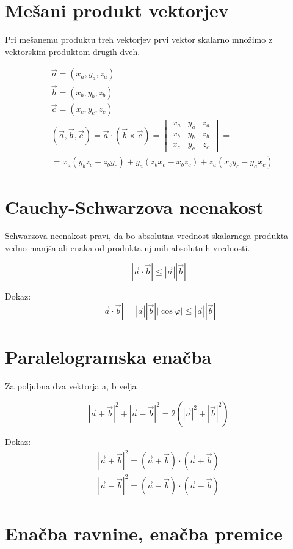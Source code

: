 \documentclass[12pt]{report}
\begin{document}
\section*{Mešani produkt vektorjev}
Pri mešanemu produktu treh vektorjev prvi vektor skalarno množimo z vektorskim produktom drugih dveh.


\begin{align*}
&\vec a = (x_a, y_a, z_a) \\
& \vec b = (x_b, y_b, z_b) \\
& \vec c=(x_c,y_c,z_c)\\
& (\vec a, \vec b,  \vec c) = \vec a \cdot (\vec b \times \vec c) = 
\begin{vmatrix}
 x_a & y_a & z_a\\ 
 x_b & y_b & z_b\\ 
 x_c & y_c & z_c
\end{vmatrix} =\\
&= x_a(y_bz_c-z_by_c) +y_a(z_bx_c-x_bz_c)+ z_a(x_by_c-y_ax_c)
\end{align*}




\section*{Cauchy-Schwarzova neenakost}

Schwarzova neenakost pravi, da bo absolutna vrednost skalarnega produkta vedno manjša ali enaka od produkta njunih absolutnih vrednosti.

\[
|\vec a \cdot \vec b| \leq|\vec a||\vec b|
\]

Dokaz:
\[
|\vec a \cdot \vec b| = |\vec a || \vec b||\cos\varphi| \leq|\vec a||\vec b|
\]

\section*{Paralelogramska enačba}
Za poljubna dva vektorja a, b velja

\[
|\vec a + \vec b|^2 + |\vec a - \vec b|^2 = 2(|\vec a|^2 +|\vec b|^2)
\]

Dokaz: 
\begin{align*}
|\vec a + \vec b|^2 = (\vec a + \vec b)\cdot (\vec a + \vec b)\\
|\vec a - \vec b|^2 = (\vec a - \vec b) \cdot (\vec a - \vec b)
\end{align*}


\section*{Enačba ravnine, enačba premice}
\end{document}
